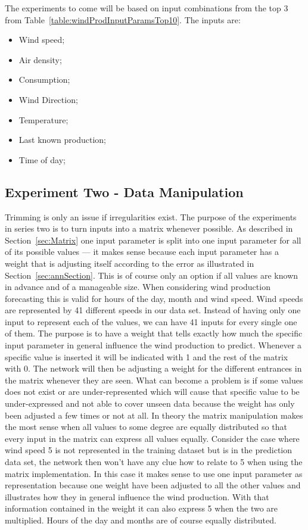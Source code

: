 The experiments to come will be based on input combinations from the top 3 from Table~\ref{table:windProdInputParamsTop10}. The inputs are:
\begin{itemize}
\item Wind speed;
\item Air density;
\item Consumption;
\item Wind Direction;
\item Temperature;
\item Last known production;
\item Time of day;
\end{itemize}

\subsection{Experiment Two - Data Manipulation}
Trimming is only an issue if irregularities exist. The purpose of the experiments in series two is to turn inputs into a matrix whenever possible. As described in Section~\ref{sec:Matrix} one input parameter is split into one input parameter for all of its possible values --- it makes sense because each input parameter has a weight that is adjusting itself according to the error as illustrated in Section~\ref{sec:annSection}. This is of course only an option if all values are known in advance and of a manageable size. When considering wind production forecasting this is valid for hours of the day, month and wind speed. Wind speeds are represented  by 41 different speeds in our data set. Instead of having only one input to represent each of the values, we can have 41 inputs for every single one of them. The purpose is to have a weight that tells exactly how much the specific input parameter in general influence the wind production to predict. Whenever a specific value is inserted it will be indicated with 1 and the rest of the matrix with 0. The network will then be adjusting a weight for the different entrances in the matrix whenever they are seen. What can become a problem is if some values does not exist or are under-represented which will cause that specific value to be under-expressed and not able to cover unseen data because the weight has only been adjusted a few times or not at all. In theory the matrix manipulation makes the most sense when all values to some degree are equally distributed so that every input in the matrix can express all values equally. Consider the case where wind speed 5 is not represented in the training dataset but is in the prediction data set, the network then won't have any clue how to relate to 5 when using the matrix implementation. In this case it makes sense to use one input parameter as representation because one weight have been adjusted to all the other values and illustrates how they in general influence the wind production. With that information contained in the weight it can also express 5 when the two are multiplied. Hours of the day and months are of course equally distributed. 

